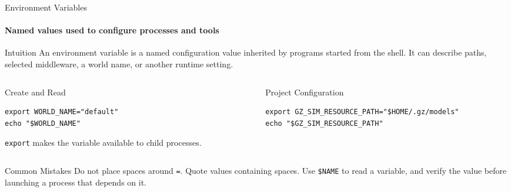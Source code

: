 \begin{frame}[fragile]{Environment Variables}
\framesubtitle{Named values used to configure processes and tools}

\footnotesize

\begin{block}{Intuition}
An environment variable is a named configuration value inherited by programs
started from the shell. It can describe paths, selected middleware, a world
name, or another runtime setting.
\end{block}

\begin{columns}[T,onlytextwidth]
    \begin{column}{0.47\textwidth}
        \begin{exampleblock}{Create and Read}
\begin{verbatim}
export WORLD_NAME="default"
echo "$WORLD_NAME"
\end{verbatim}
            \texttt{export} makes the variable available to child processes.
        \end{exampleblock}
    \end{column}

    \begin{column}{0.47\textwidth}
        \begin{exampleblock}{Project Configuration}
\begin{verbatim}
export GZ_SIM_RESOURCE_PATH="$HOME/.gz/models"
echo "$GZ_SIM_RESOURCE_PATH"
\end{verbatim}
        \end{exampleblock}
    \end{column}
\end{columns}

\begin{alertblock}{Common Mistakes}
Do not place spaces around \texttt{=}. Quote values containing spaces. Use
\texttt{\$NAME} to read a variable, and verify the value before launching a
process that depends on it.
\end{alertblock}
\end{frame}



